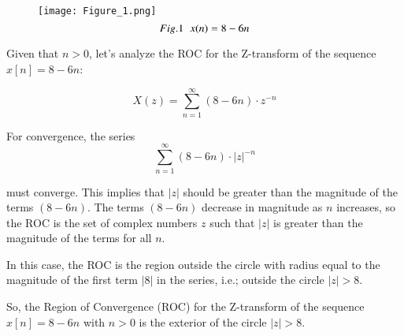 \documentclass[journal,12pt,twocolumn]{IEEEtran}
\theoremstyle{remark}
\begin{document}
\begin{figure}[h]
    \centering
    \texttt{[image: Figure\_1.png]}
    \[Fig. 1\hspace{2mm}x(n) = 8 - 6n\]
\end{figure}

Given that \( n > 0 \), let's analyze the ROC for the Z-transform of the sequence \( x[n] = 8 - 6n \):

\[X(z) = \sum_{n=1}^{\infty} (8 - 6n) \cdot z^{-n}\]

For convergence, the series 
\vspace{2mm}
\[\sum_{n=1}^{\infty} (8 - 6n) \cdot |z|^{-n}\]

\vspace{2mm}
must converge. This implies that \( |z| \) should be greater than the magnitude of the terms \( (8 - 6n) \). The terms \( (8 - 6n) \) decrease in magnitude as \( n \) increases, so the ROC is the set of complex numbers \( z \) such that \( |z| \) is greater than the magnitude of the terms for all \( n \).
\vspace{2mm}

In this case, the ROC is the region outside the circle with radius equal to the magnitude of the first term \( |8| \) in the series, i.e.; outside the circle \( |z| > 8 \).
\vspace{2mm}

So, the Region of Convergence (ROC) for the Z-transform of the sequence \( x[n] = 8 - 6n \) with \( n > 0 \) is the exterior of the circle \( |z| > 8 \).
\end{document}
